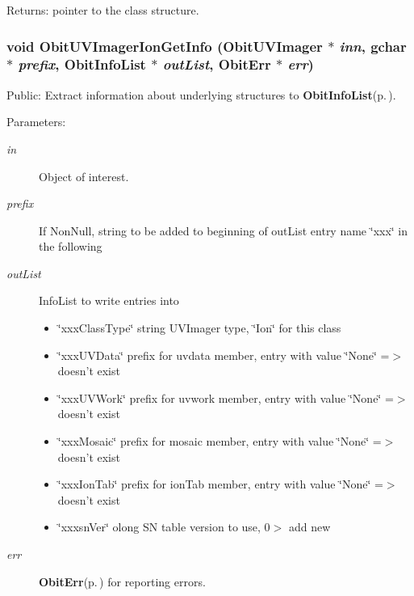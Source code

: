\begin{Desc}
\item[Returns:]pointer to the class structure. \end{Desc}
\subsubsection{\setlength{\rightskip}{0pt plus 5cm}void Obit\-UVImager\-Ion\-Get\-Info ({\bf Obit\-UVImager} $\ast$ {\em inn}, gchar $\ast$ {\em prefix}, {\bf Obit\-Info\-List} $\ast$ {\em out\-List}, {\bf Obit\-Err} $\ast$ {\em err})}\label{ObitUVImagerIon_8c_a17}


Public: Extract information about underlying structures to {\bf Obit\-Info\-List}{\rm (p.\,\pageref{structObitInfoList})}. 

\begin{Desc}
\item[Parameters:]
\begin{description}
\item[{\em in}]Object of interest. \item[{\em prefix}]If Non\-Null, string to be added to beginning of out\-List entry name \char`\"{}xxx\char`\"{} in the following \item[{\em out\-List}]Info\-List to write entries into \begin{itemize}
\item \char`\"{}xxx\-Class\-Type\char`\"{} string UVImager type, \char`\"{}Ion\char`\"{} for this class \item \char`\"{}xxx\-UVData\char`\"{} prefix for uvdata member, entry with value \char`\"{}None\char`\"{} =$>$ doesn't exist \item \char`\"{}xxx\-UVWork\char`\"{} prefix for uvwork member, entry with value \char`\"{}None\char`\"{} =$>$ doesn't exist \item \char`\"{}xxx\-Mosaic\char`\"{} prefix for mosaic member, entry with value \char`\"{}None\char`\"{} =$>$ doesn't exist \item \char`\"{}xxx\-Ion\-Tab\char`\"{} prefix for ion\-Tab member, entry with value \char`\"{}None\char`\"{} =$>$ doesn't exist \item \char`\"{}xxxsn\-Ver\char`\"{} olong SN table version to use, 0$>$ add new \end{itemize}
\item[{\em err}]{\bf Obit\-Err}{\rm (p.\,\pageref{structObitErr})} for reporting errors. \end{description}
\end{Desc}
